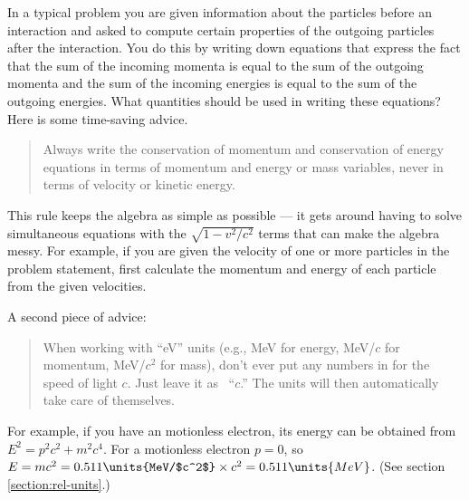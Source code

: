  In a typical problem you are given information about the particles
before an interaction and asked to compute certain properties of the
outgoing particles after the interaction.  You do this by writing down
equations that express the fact that the sum of the incoming momenta
is equal to the sum of the outgoing momenta and the sum of the
incoming energies is equal to the sum of the outgoing energies.  What
quantities should be used in writing these equations?  Here is some
time-saving advice.
\begin{quote}
Always write the conservation of momentum and conservation of energy
equations in terms of momentum and energy or mass variables, never in
terms of velocity or kinetic energy.
\end{quote}

This rule keeps the algebra as simple as possible --- it gets around
having to solve simultaneous equations with the $\sqrt{1-v^2/c^2}$
terms that can make the algebra messy.  For example, if you are given
the velocity of one or more particles in the problem statement, first
calculate the momentum and energy of each particle from the given
velocities.

A second piece of advice:
\begin{quote}
When working with ``eV'' units (e.g., MeV for energy, MeV/$c$ for
momentum, MeV/$c^2$ for mass), don't ever put any numbers in for the
speed of light $c$.  Just leave it as ~``$c$.''  The units will then
automatically take care of themselves.
\end{quote}

For example, if you have an motionless electron, its energy can be
obtained from $E^2 = p^2c^2+m^2c^4$. For a motionless electron  $p = 0$, 
so $E= mc^2 = 0.511\units{MeV/$c^2$}\times c^2 = 0.511\units{MeV}$.  
(See section \ref{section:rel-units}.)

